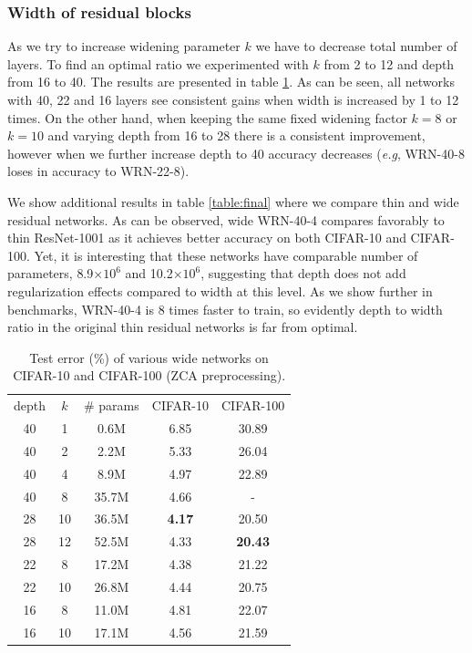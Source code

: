 \documentclass{bmvc2k}
\def\eg{\emph{e.g}\bmvaOneDot}
\begin{document}
\subsubsection*{Width of residual blocks} As we try to increase widening parameter $k$ we have to decrease total number of layers. To find an optimal ratio we experimented with $k$ from 2 to 12 and depth from 16 to 40. The results are presented in table \ref{table:width}. As can be seen, all networks with 40, 22 and 16 layers see consistent gains when width is increased  by 1 to 12 times. On the other hand, when keeping  the same  fixed widening factor $k=8$ or $k=10$ and varying depth from 16 to 28 there is a consistent improvement, however when we further increase depth to 40 accuracy decreases (\eg, WRN-40-8 loses in accuracy to WRN-22-8).

We show additional results in table \ref{table:final} where we compare thin and wide residual networks. As can be observed, wide WRN-40-4 compares favorably to thin ResNet-1001 as it achieves better  accuracy on both CIFAR-10 and CIFAR-100. Yet, it is interesting that these networks have comparable number of parameters, {8.9$\times10^6$} and 10.2$\times10^6$, suggesting that depth does not add regularization effects compared to width at this level. As we show further in benchmarks, WRN-40-4 is 8 times faster to train, so evidently depth to width ratio in the original thin residual networks is far from optimal.

\begin{table}
  \centering
  \begin{tabular}{c|c|c|c|c}
\hline
depth & $k$ & \# params & CIFAR-10 & CIFAR-100 \\
\Xhline{2\arrayrulewidth}
40 & 1 & 0.6M & 6.85 & 30.89\\
40 & 2 & 2.2M & 5.33 & 26.04\\
40 & 4 & 8.9M & 4.97 & 22.89\\
40 & 8 & 35.7M & 4.66 & - \\
28 & 10 & 36.5M & \textbf{4.17} & 20.50\\
28 & 12 & 52.5M & 4.33 & \textbf{20.43}\\
22 & 8 & 17.2M & 4.38 & 21.22\\
22 & 10 & 26.8M & 4.44 & 20.75\\
16 & 8 & 11.0M & 4.81 & 22.07\\
16 & 10 & 17.1M & 4.56 & 21.59\\
\hline
  \end{tabular}
  \caption{Test error (\%) of various wide networks on CIFAR-10 and CIFAR-100 (ZCA preprocessing).}
  \label{table:width}
\end{table}
\end{document}
